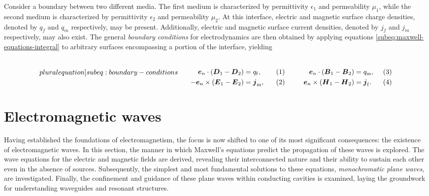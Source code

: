 \documentclass[11pt,a4paper,twoside,openany]{report}
\begin{document}
Consider a boundary between two different media. The first medium is characterized by permittivity $\epsilon_1$ and permeability $\mu_1$, while the second medium is characterized by permittivity $\epsilon_2$ and permeability $\mu_2$. At this interface, electric and magnetic surface charge densities, denoted by $q_f$ and $q_m$ respectively, may be present. Additionally, electric and magnetic surface current densities, denoted by $j_f$ and $j_m$ respectively, may also exist. The general \emph{boundary conditions} for electrodynamics are then obtained by applying equations \cref{subeq:maxwell-equations-integral} to arbitrary surfaces encompassing a portion of the interface, yielding

\begin{subequations}
    \label[pluralequation]{subeq:boundary-conditions}
    \noindent\centering
    \begin{minipage}{0.45\textwidth}
        \begin{align}
            \label{eq:boundary-conditions-d-normal}
            \vec e_n \cdot (\vec D_1 - \vec D_2) &= q_{\mathrm f},
        \\
            \label{eq:boundary-conditions-e-tangential}
            -\vec e_n \times (\vec E_1 - \vec E_2) &= \vec j_{\mathrm m},
        \end{align}
    \end{minipage}
    \hfill
    \begin{minipage}{0.45\textwidth}
        \begin{align}
            \label{eq:boundary-conditions-b-normal}
            \vec e_n \cdot (\vec B_1 - \vec B_2) &= q_{\mathrm m},
        \\
            \label{eq:boundary-conditions-H-tangential}
            \vec e_n \times (\vec H_1 - \vec H_2) &= \vec j_{\mathrm f}.
        \end{align}
    \end{minipage}
    \bigskip
\end{subequations}

\section{Electromagnetic waves}
\label{sec:electromagnetic-waves}
Having established the foundations of electromagnetism, the focus is now shifted to one of its most significant consequences: the existence of electromagnetic waves. In this section, the manner in which Maxwell's equations predict the propagation of these waves is explored.  The wave equations for the electric and magnetic fields are derived, revealing their interconnected nature and their ability to sustain each other even in the absence of sources. Subsequently, the simplest and most fundamental solutions to these equations, \emph{monochromatic plane waves}, are investigated. Finally, the confinement and guidance of these plane waves within conducting cavities is examined, laying the groundwork for understanding waveguides and resonant structures.
\end{document}
